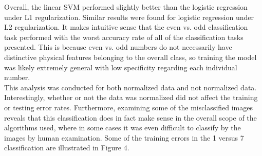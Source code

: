 \documentclass{article}
\begin{document}
Overall, the linear SVM performed slightly better than the logistic regression under L1 regularization. Similar results were found for logistic regression under L2 regularization. It makes intuitive sense that the even vs. odd classification task performed with the worst accuracy rate of all of the classification tasks presented. This is because even vs. odd numbers do not necessarily have distinctive physical features belonging to the overall class, so training the model was likely extremely general with low specificity regarding each individual number. \\

This analysis was conducted for both normalized data and not normalized data. Interestingly, whether or not the data was normalized did not affect the training or testing error rates. Furthermore, examining some of the misclassified images reveals that this classification does in fact make sense in the overall scope of the algorithms used, where in some cases it was even difficult to classify by the images by human examination. Some of the training errors in the 1 versus 7 classification are illustrated in Figure 4.
\end{document}
